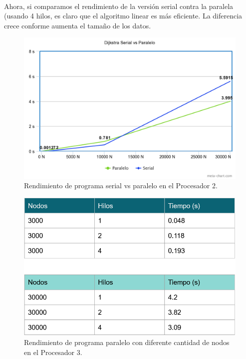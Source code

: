 \documentclass[11pt]{article}
\begin{document}
\paragraph{}
Ahora, si comparamos el rendimiento de la versión serial contra la paralela (usando 4 hilos, es claro que el algoritmo linear es más eficiente. La diferencia crece conforme aumenta el tamaño de los datos. 

\begin{figure}[!h]
\centering
\includegraphics[width=1\linewidth]{tablas.png}
  \caption{Rendimiento de programa serial vs paralelo en el Procesador 2.}
\end{figure}

\begin{figure}
\centering
\includegraphics[width=0.9\linewidth]{tablas1.png}
  \caption{Rendimiento de programa paralelo con diferente cantidad de nodos en el Procesador 3.}
\end{figure}
\end{document}
